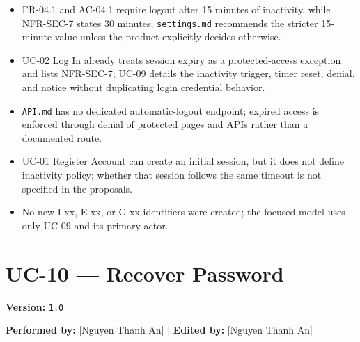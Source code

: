 \documentclass[12pt]{article}
\begin{document}
\begin{itemize}
\item FR-04.1 and AC-04.1 require logout after 15 minutes of inactivity, while NFR-SEC-7 states 30 minutes; \texttt{settings.md} recommends the stricter 15-minute value unless the product explicitly decides otherwise.
\item UC-02 Log In already treats session expiry as a protected-access exception and lists NFR-SEC-7; UC-09 details the inactivity trigger, timer reset, denial, and notice without duplicating login credential behavior.
\item \texttt{API.md} has no dedicated automatic-logout endpoint; expired access is enforced through denial of protected pages and APIs rather than a documented route.
\item UC-01 Register Account can create an initial session, but it does not define inactivity policy; whether that session follows the same timeout is not specified in the proposals.
\item No new I-xx, E-xx, or G-xx identifiers were created; the focused model uses only UC-09 and its primary actor.
\end{itemize}
\par\medskip

\pagebreak
\hypertarget{sec:uc-10-recover-password}{}
\section*{UC-10 --- Recover Password}
\par\medskip

\textbf{Version:} \texttt{1.0}
\par\medskip

\textbf{Performed by:} [Nguyen Thanh An] | \textbf{Edited by:} [Nguyen Thanh An]
\par\medskip
\end{document}
